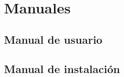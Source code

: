\chapter{Manuales}\label{chap:manual}

\section{Manual de usuario}\label{sec:manual_usuario}

\section{Manual de instalación}\label{sec:manual_instalacion}
